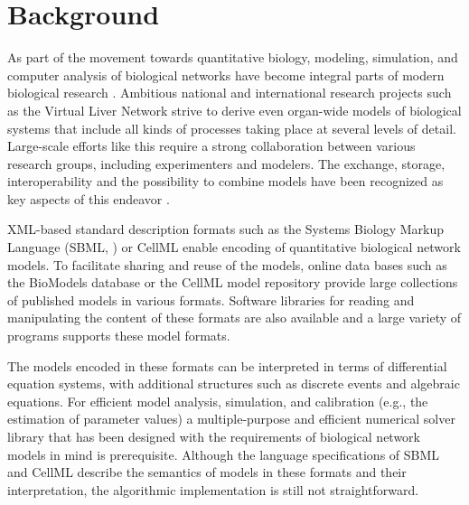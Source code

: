 \documentclass[10pt]{bmc_article}
\newenvironment{bmcformat}{\baselineskip20pt\sloppy\setboolean{publ}{false}}{\baselineskip20pt\sloppy}
\newcommand{\TODO}[1]{\textcolor{red}{\textbf{#1}}}
\begin{document}
\begin{bmcformat}
\section*{Background}

As part of the movement towards quantitative biology, modeling, 
simulation, and computer analysis of biological networks have become integral
parts of modern biological research \TODO{\cite{Macilwain2011}}.
Ambitious national and international research projects such as the Virtual Liver
Network \cite{Holzhuetter2012} strive to derive even organ-wide models of
biological systems that include all kinds of processes taking place at several
levels of detail.
Large-scale efforts like this require a strong collaboration between various
research groups, including experimenters and modelers. The exchange, storage,
interoperability and the possibility to combine models have been recognized as
key aspects of this endeavor \cite{Liebermeister2009sta}.

XML-based standard description formats \cite{Bray2000} such as the Systems
Biology Markup Language (SBML, \cite{Hucka2004}) or CellML \cite{Lloyd2004}
enable encoding of quantitative biological network models.
To facilitate sharing and reuse of the models, online data bases such as the
BioModels database \cite{Novere2006a} or the CellML model repository
\cite{Lloyd2008} provide large collections of published models in various
formats.
Software libraries for reading and manipulating the content
of these formats are also available \cite{Bornstein2008, Miller2010,
Draeger2011b} and a large variety of programs supports these model formats.

The models encoded in these formats can be interpreted in terms of differential
equation systems, with additional structures such as discrete events and
algebraic equations. 
For efficient model analysis, simulation, and calibration (e.g.,
the estimation of parameter values) a multiple-purpose and efficient numerical
solver library that has been designed with the requirements of biological
network models in mind is prerequisite.
Although the language specifications of SBML \cite{Hucka2001, Hucka2003,
Finney2003a, Finney2006, Hucka2007, Hucka2008, Hucka2010a} 
and CellML \cite{Cuellar2006} describe the semantics of models in these formats
and their interpretation, the algorithmic implementation is still not
straightforward.


\end{bmcformat}
\end{document}
